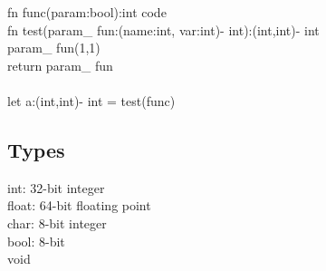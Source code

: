 fn func(param:bool):int {code}\\


fn test(param\_ fun:(name:int, var:int)-\> int):(int,int)-\> int {\\
param\_ fun(1,1)\\
return param\_ fun\\
}\\

let a:(int,int)-\> int = test(func)\\

\subsection{Types}
int: 32-bit integer\\
float: 64-bit floating point\\
char: 8-bit integer\\
bool: 8-bit\\
void
